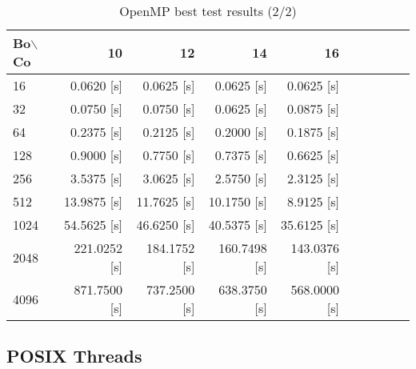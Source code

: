     \begin{table}[h!]
        \centering
        \small
        \begin{tabular}{|l|r|r|r|r|r|r|r|r|r|}
            \hline
            Bo$\backslash$Co & 10           & 12           & 14           & 16           \\\hline
            16               & 0.0620 [s]   & 0.0625 [s]   & 0.0625 [s]   & 0.0625 [s]   \\\hline
            32               & 0.0750 [s]   & 0.0750 [s]   & 0.0625 [s]   & 0.0875 [s]   \\\hline
            64               & 0.2375 [s]   & 0.2125 [s]   & 0.2000 [s]   & 0.1875 [s]   \\\hline
            128              & 0.9000 [s]   & 0.7750 [s]   & 0.7375 [s]   & 0.6625 [s]   \\\hline
            256              & 3.5375 [s]   & 3.0625 [s]   & 2.5750 [s]   & 2.3125 [s]   \\\hline
            512              & 13.9875 [s]  & 11.7625  [s] & 10.1750 [s]  & 8.9125 [s]   \\\hline
            1024             & 54.5625 [s]  & 46.6250  [s] & 40.5375 [s]  & 35.6125 [s]  \\\hline
            2048             & 221.0252 [s] & 184.1752 [s] & 160.7498 [s] & 143.0376 [s] \\\hline
            4096             & 871.7500 [s] & 737.2500 [s] & 638.3750 [s] & 568.0000 [s] \\\hline
        \end{tabular}
        \caption{OpenMP best test results (2/2)}
        \label{tab:openmp}
    \end{table}

\subsection{POSIX Threads}


